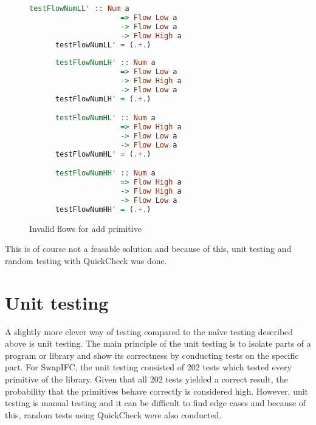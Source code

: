 \begin{figure}[h]
  \begin{center}
    \begin{lstlisting}[language=Haskell]
      testFlowNumLL' :: Num a
                     => Flow Low a
                     -> Flow Low a
                     -> Flow High a
      testFlowNumLL' = (.+.)
    
      testFlowNumLH' :: Num a
                     => Flow Low a
                     -> Flow High a
                     -> Flow Low a
      testFlowNumLH' = (.+.)

      testFlowNumHL' :: Num a
                     => Flow High a
                     -> Flow Low a
                     -> Flow Low a
      testFlowNumHL' = (.+.)

      testFlowNumHH' :: Num a
                     => Flow High a
                     -> Flow High a
                     -> Flow Low a
      testFlowNumHH' = (.+.)
    \end{lstlisting}
  \end{center}
  \caption{Invalid flows for add primitive}
  \label{fig:invalidFlow}
\end{figure}
This is of course not a feasable solution and because of this, unit testing and random testing with QuickCheck was done.

\section{Unit testing}
A slightly more clever way of testing compared to the naîve testing described above is unit testing. The main principle of the unit testing is to isolate parts of a program or library and show its correctness by conducting tests on the specific part. For SwapIFC, the unit testing consisted of 202 tests which tested every primitive of the library. Given that all 202 tests yielded a correct result, the probability that the primitives behave correctly is considered high. However, unit testing is manual testing and it can be difficult to find edge cases and because of this, random tests using QuickCheck were also conducted.

